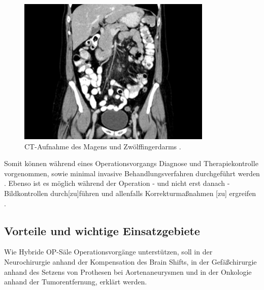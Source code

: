 \begin{figure}[!htb]
	\includegraphics[width=\linewidth]{Content/Pictures/mrtct.png}
	\caption{CT-Aufnahme des Magens und Zwölffingerdarms \cite{CTBild}.}
	\label{fig:mrtct}
	\endminipage
\end{figure}

Somit können während eines Operationsvorgangs Diagnose und Therapiekontrolle vorgenommen, sowie minimal invasive Behandlungsverfahren durchgeführt werden \cite{SHG-Kliniken}. Ebenso ist es möglich \glqq während der Operation - und nicht erst danach - Bildkontrollen durch[zu]führen und allenfalls Korrekturmaßnahmen [zu] ergreifen\grqq{} \cite{OPderZukunft}. 

\subsection{Vorteile und wichtige Einsatzgebiete}

Wie Hybride OP-Säle Operationsvorgänge unterstützen, soll in der Neurochirurgie anhand der Kompensation des Brain Shifts, in der Gefäßchirurgie anhand des Setzens von Prothesen bei Aortenaneurysmen und in der Onkologie anhand der Tumorentfernung, erklärt werden.

